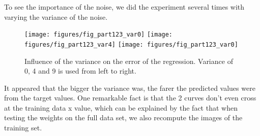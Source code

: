 To see the importance of the noise, we did the experiment several times with varying the variance of the noise.
 \begin{figure}  
	
		\texttt{[image: figures/fig\_part123\_var0]}
		\texttt{[image: figures/fig\_part123\_var4]}
		\texttt{[image: figures/fig\_part123\_var0]}
	\caption{Influence of the variance on the error of the regression. Variance of 0, 4 and 9 is used from left to right.}
\end{figure}                 


It appeared that the bigger the variance was, the farer the predicted values were from the target values. One remarkable fact is that the 2 curves don't even cross at the training data x value, which can be explained by the fact that when testing the weights on the full data set, we also recompute the images of the training set.





